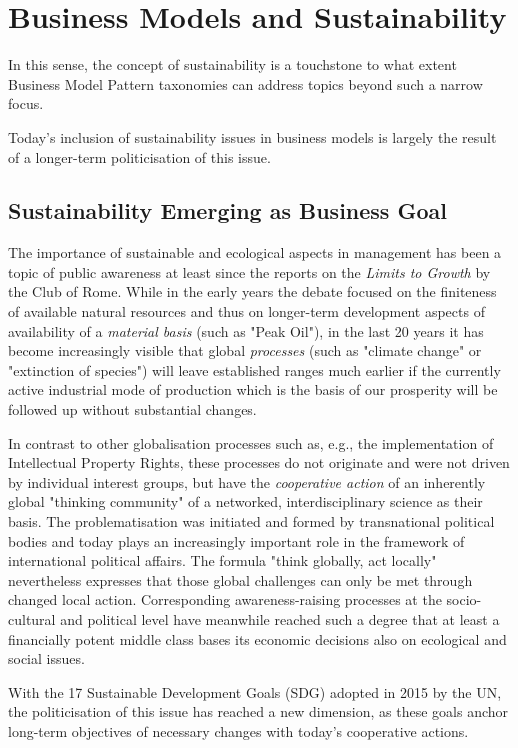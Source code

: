 \documentclass[11pt,a4paper]{article}
\begin{document}
\section{Business Models and Sustainability}

In this sense, the concept of sustainability is a touchstone to what extent
Business Model Pattern taxonomies can address topics beyond such a narrow
focus.

Today's inclusion of sustainability issues in business models is largely the
result of a longer-term politicisation of this issue.

\subsection{Sustainability Emerging as Business Goal}

The importance of sustainable and ecological aspects in management has been a
topic of public awareness at least since the reports on the \emph{Limits to
  Growth} by the Club of Rome. While in the early years the debate focused on
the finiteness of available natural resources and thus on longer-term
development aspects of availability of a \emph{material basis} (such as "Peak
Oil"), in the last 20 years it has become increasingly visible that global
\emph{processes} (such as "climate change" or "extinction of species") will
leave established ranges much earlier if the currently active industrial mode
of production which is the basis of our prosperity will be followed up without
substantial changes.  

In contrast to other globalisation processes such as, e.g., the implementation
of Intellectual Property Rights, these processes do not originate and were not
driven by individual interest groups, but have the \emph{cooperative action}
of an inherently global "thinking community" of a networked, interdisciplinary
science as their basis. The problematisation was initiated and formed by
transnational political bodies and today plays an increasingly important role
in the framework of international political affairs. The formula "think
globally, act locally" nevertheless expresses that those global challenges can
only be met through changed local action. Corresponding awareness-raising
processes at the socio-cultural and political level have meanwhile reached
such a degree that at least a financially potent middle class bases its
economic decisions also on ecological and social issues.

With the 17 Sustainable Development Goals (SDG) adopted in 2015 by the UN, the
politicisation of this issue has reached a new dimension, as these goals
anchor long-term objectives of necessary changes with today's cooperative
actions.
\end{document}
